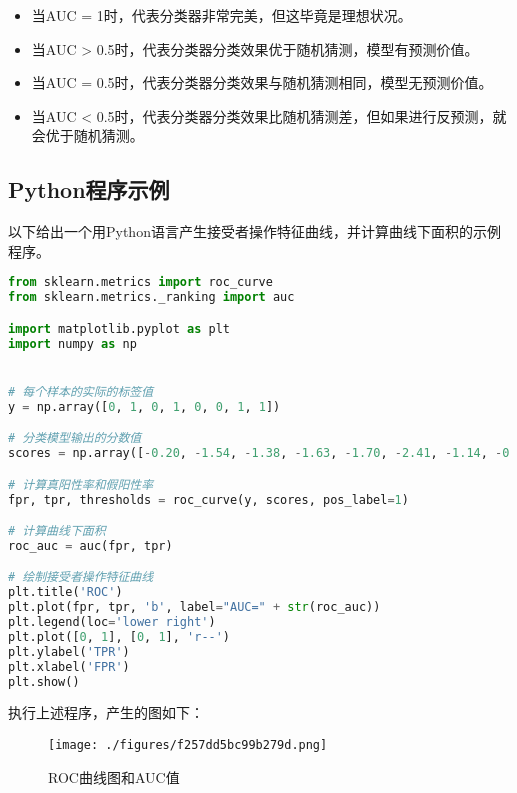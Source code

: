 \begin{itemize}
\item 当AUC = 1时，代表分类器非常完美，但这毕竟是理想状况。
\item 当AUC > 0.5时，代表分类器分类效果优于随机猜测，模型有预测价值。
\item 当AUC = 0.5时，代表分类器分类效果与随机猜测相同，模型无预测价值。
\item 当AUC < 0.5时，代表分类器分类效果比随机猜测差，但如果进行反预测，就会优于随机猜测。
\end{itemize}

\subsection{Python程序示例}
以下给出一个用Python语言产生接受者操作特征曲线，并计算曲线下面积的示例程序。
\begin{lstlisting}[language=python]
from sklearn.metrics import roc_curve
from sklearn.metrics._ranking import auc

import matplotlib.pyplot as plt
import numpy as np


# 每个样本的实际的标签值
y = np.array([0, 1, 0, 1, 0, 0, 1, 1]) 

# 分类模型输出的分数值
scores = np.array([-0.20, -1.54, -1.38, -1.63, -1.70, -2.41, -1.14, -0.79])

# 计算真阳性率和假阳性率
fpr, tpr, thresholds = roc_curve(y, scores, pos_label=1)

# 计算曲线下面积
roc_auc = auc(fpr, tpr)

# 绘制接受者操作特征曲线
plt.title('ROC')
plt.plot(fpr, tpr, 'b', label="AUC=" + str(roc_auc))
plt.legend(loc='lower right')
plt.plot([0, 1], [0, 1], 'r--')
plt.ylabel('TPR')
plt.xlabel('FPR')
plt.show()
\end{lstlisting}

执行上述程序，产生的图如下：
\begin{figure}[ht]
\centering
\texttt{[image: ./figures/f257dd5bc99b279d.png]}
\caption{ROC曲线图和AUC值} \label{fig_ROC_2}
\end{figure}